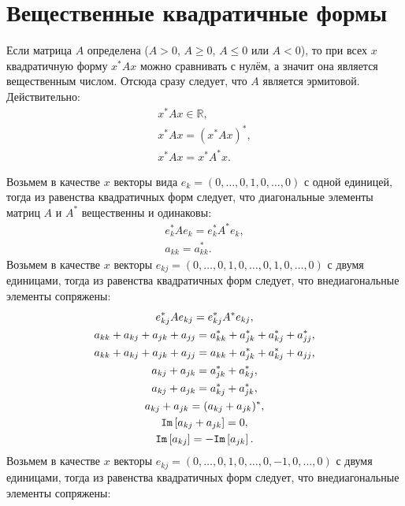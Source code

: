 \section{Вещественные квадратичные формы}

Если матрица $A$ определена ($A > 0$, $A \ge 0$, $A \le 0$ или $A < 0$), то при всех $x$ квадратичную форму $x^* A x$ можно сравнивать с нулём, а значит она является
вещественным числом. Отсюда сразу следует, что $A$ является эрмитовой. Действительно:
\begin{gather*}
    x^* A x \in \mathbb{R} , \\
    x^* A x = ( x^* A x )^* , \\
    x^* A x = x^* A^* x .
\end{gather*}

Возьмем в качестве $x$ векторы вида $e_k = (0, \dots, 0, 1, 0, \dots, 0)$ с одной единицей, тогда из равенства квадратичных форм следует, что диагональные
элементы матриц $A$ и $A^*$ вещественны и одинаковы:
\begin{gather*}
    e_k^* A e_k = e_k^* A^* e_k , \\
    a_{kk} = a_{kk}^* .
\end{gather*}
Возьмем в качестве $x$ векторы $e_{kj} = (0, \dots, 0, 1, 0, \dots, 0, 1, 0, \dots, 0)$ с двумя единицами, тогда из равенства квадратичных форм следует,
что внедиагональные элементы сопряжены:
\begin{gather*}
    e_{kj}^* A e_{kj} = e_{kj}^* A^* e_{kj} , \\
    a_{kk} + a_{kj} + a_{jk} + a_{jj} = a_{kk}^* + a_{jk}^* + a_{kj}^* + a_{jj}^* , \\
    a_{kk} + a_{kj} + a_{jk} + a_{jj} = a_{kk} + a_{jk}^* + a_{kj}^* + a_{jj} , \\
    a_{kj} + a_{jk} = a_{jk}^* + a_{kj}^* , \\
    a_{kj} + a_{jk} = a_{kj}^* + a_{jk}^* , \\
    a_{kj} + a_{jk} = ( a_{kj} + a_{jk} )^* , \\
    \mathtt{Im} \left [ a_{kj} + a_{jk} \right ] = 0 , \\
    \mathtt{Im} \left [ a_{kj} \right ] = - \mathtt{Im} \left [ a_{jk} \right ] .
\end{gather*}
Возьмем в качестве $x$ векторы $e_{kj} = (0, \dots, 0, 1, 0, \dots, 0, -1, 0, \dots, 0)$ с двумя единицами, тогда из равенства квадратичных форм следует,
что внедиагональные элементы сопряжены:

